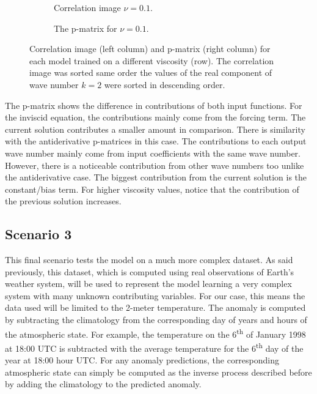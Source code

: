 \begin{figure}[H]
\begin{subfigure}{0.49\linewidth}
    \begin{adjustbox}{width=\linewidth}
      
    \end{adjustbox}
    \caption{Correlation image \(\nu=0.1\).}\label{fig:sc2_ci_0.1}
  \end{subfigure}
  \begin{subfigure}{0.49\linewidth}
    \begin{adjustbox}{width=\linewidth}
      
    \end{adjustbox}
    \caption{The p-matrix for \(\nu=0.1\).}\label{fig:sc2_pm_0.1}
  \end{subfigure}
  \caption{Correlation image (left column) and p-matrix (right column) for each model trained on a different viscosity (row). The correlation image was sorted same order the values of the real component of wave number \(k=2\) were sorted in descending order.}\label{fig:scenario_2_interpretation}
\end{figure}

The p-matrix shows the difference in contributions of both input functions. For the inviscid equation, the contributions mainly come from the forcing term. The current solution contributes a smaller amount in comparison. There is similarity with the antiderivative p-matrices in this case. The contributions to each output wave number mainly come from input coefficients with the same wave number. However, there is a noticeable contribution from other wave numbers too unlike the antiderivative case. The biggest contribution from the current solution is the constant/bias term. For higher viscosity values, notice that the contribution of the previous solution increases.

\subsection{Scenario 3}
\noindent This final scenario tests the model on a much more complex dataset. As said previously, this dataset, which is computed using real observations of Earth's weather system, will be used to represent the model learning a very complex system with many unknown contributing variables. For our case, this means the data used will be limited to the 2-meter temperature. The anomaly is computed by subtracting the climatology from the corresponding day of years and hours of the atmospheric state. For example, the temperature on the 6\textsuperscript{th} of January 1998 at 18:00 UTC is subtracted with the average temperature for the 6\textsuperscript{th} day of the year at 18:00 hour UTC\@. For any anomaly predictions, the corresponding atmospheric state can simply be computed as the inverse process described before by adding the climatology to the predicted anomaly.

